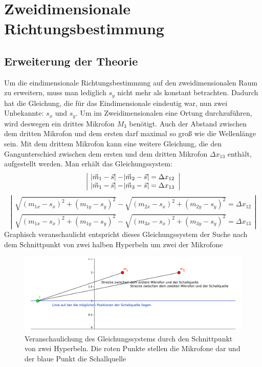 \section{Zweidimensionale Richtungsbestimmung}
\subsection{Erweiterung der Theorie}
Um die eindimensionale Richtungsbestimmung auf den zweidimensionalen Raum zu erweitern, muss man lediglich $s_y$ nicht mehr als konstant betrachten. Dadurch hat die Gleichung, die für das Eindimensionale eindeutig war, nun zwei Unbekannte: $s_x$ und $s_y$. Um im Zweidimensionalen eine Ortung durchzuführen, wird deswegen ein drittes Mikrofon $M_3$ benötigt. Auch der Abstand zwischen dem dritten Mikrofon und dem ersten darf maximal so groß wie die Wellenlänge sein. Mit dem drittem Mikrofon kann eine weitere Gleichung, die den Gangunterschied zwischen dem ersten und dem dritten Mikrofon $\Delta{x_{13}}$ enthält, aufgestellt werden. Man erhält das Gleichungssystem:
$$\left|\begin{array}{c}
  \abs{\vec{m}_1 - \vec{s}} - \abs{\vec{m}_2 - \vec{s}} = \Delta{x_{12}} \\
  \abs{\vec{m}_1 - \vec{s}} - \abs{\vec{m}_3 - \vec{s}} = \Delta{x_{13}}
\end{array}\right|$$
$$\left|\begin{array}{c}
  \sqrt{{(m_{1x} - s_x)}^2 + {(m_{1y} - s_y)}^2} - \sqrt{{(m_{2x} - s_x)}^2 + {(m_{2y} - s_y)}^2} = \Delta{x_{12}} \\
  \sqrt{{(m_{1x} - s_x)}^2 + {(m_{1y} - s_y)}^2} - \sqrt{{(m_{3x} - s_x)}^2 + {(m_{3y} - s_y)}^2} = \Delta{x_{13}}
\end{array}\right|$$
Graphisch veranschaulicht entspricht dieses Gleichungssystem der Suche nach dem Schnittpunkt von zwei halben Hyperbeln um zwei der Mikrofone
\begin{figure}[H]
	\vspace{-20pt}
  \includegraphics[width=\linewidth]{img/skizze1d}
  \caption{Veranschaulichung des Gleichungssystems durch den Schnittpunkt von zwei Hyperbeln. Die roten Punkte stellen die Mikrofone dar und der blaue Punkt die Schallquelle}
\end{figure}

